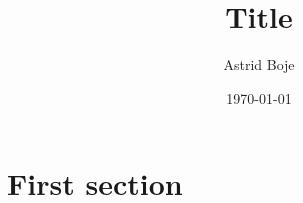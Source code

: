 \documentclass[aspectratio=169]{beamer}
\title{\huge{Title}}
\author{Astrid Boje}
\date{\small\today}
\begin{document}
	
	\mytitleframe
	
	\section{First section}
	
	
\end{document}
